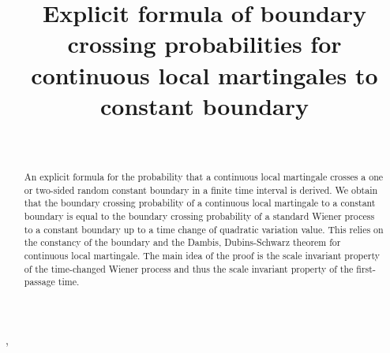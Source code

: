 \documentclass[aop]{imsart}
\theoremstyle{plain}
\theoremstyle{remark}
\begin{document}
\begin{frontmatter}
\title{Explicit formula of boundary crossing probabilities for continuous local martingales to constant boundary}

\begin{aug}

\author[A]{~},
\address[A]{Faculty of Business and Commerce, Keio University}
\end{aug}




\begin{abstract}
An explicit formula for the probability that a continuous local martingale crosses a one or two-sided random constant boundary in a finite time interval is derived. We obtain that the boundary crossing probability of a continuous local martingale to a constant boundary is equal to the boundary crossing probability of a standard Wiener process to a constant boundary up to a time change of quadratic variation value. This relies on the constancy of the boundary and the Dambis, Dubins-Schwarz theorem for continuous local martingale. The main idea of the proof is the scale invariant property of the time-changed Wiener process and thus the scale invariant property of the first-passage time.
\end{abstract}

\begin{keyword}[class=MSC]
\end{keyword}

\begin{keyword}
\end{keyword}


\end{frontmatter}
\end{document}
